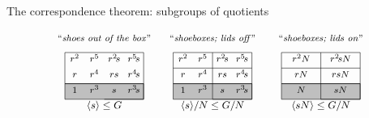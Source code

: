 \documentclass[8pt, handout]{beamer}
\begin{document}
\begin{frame}{The correspondence theorem: subgroups of quotients}
  \medskip

  \[
  \begin{tikzpicture}[scale=.61]
    \tikzstyle{every node}=[font=\footnotesize,anchor=south]
    \begin{scope}[shift={(11,0)}]
      \node at (2,2.7) {``\emph{shoeboxes; lids on}''};
      \draw[thin,fill=faded] (0,0) rectangle (4,.8);
      \draw[thin] (0,2.4) to (4,2.4); 
      \draw[thin] (0,1.6) to (4,1.6);
      \draw[thin] (0,.8) to (4,.8);
      \draw[thin] (2,0) to (4,0);
      \draw[thin] (4,0) to (4,2.4);
      \draw[thin] (0,.8) to (0,2.4);
      \draw[thin] (2,0) to (2,2.4);
      \node at (1,.13) {$N$};
      \node at (3,.13) {$sN$};
      \node at (1,.93) {$rN$};
      \node at (3,.93) {$rsN$};
      \node at (1,1.73) {$r^2N$};
      \node at (3,1.73) {$r^2\!sN$};
      \node at (2,-.8) {\small $\<sN\>\leq G/N$};
    \end{scope}
    \begin{scope}[shift={(5.5,0)}]
      \node at (2,2.7) {``\emph{shoeboxes; lids off}''};
      \draw[thin,fill=faded] (0,0) rectangle (4,.8);
      \draw[thin] (0,2.4) to (4,2.4); 
      \draw[thin] (0,1.6) to (4,1.6);
      \draw[thin] (0,.8) to (4,.8);
      \draw[thin] (2,0) to (4,0);
      \draw[thin] (4,0) to (4,2.4);
      \draw[thin] (0,.8) to (0,2.4);
      \node at (.5,.13) {$1$};
      \node at (1.5,.13) {$r^3$};
      \node at (2.5,.13) {$s$};
      \node at (3.5,.13) {$r^3\!s$};
      \node at (.5,.93) {$r$};
      \node at (1.5,.93) {$r^4$};
      \node at (2.5,.93) {$rs$};
      \node at (3.5,.93) {$r^4\!s$};
      \node at (.5,1.73) {$r^2$};
      \node at (1.5,1.73) {$r^5$};
      \node at (2.5,1.73) {$r^2\!s$};
      \node at (3.5,1.73) {$r^5\!s$};
      \node at (2,-.8) {\small $\<s\>/N\leq G/N$};
      \draw[thin] (2,0) to (2,2.4);
    \end{scope}
    \begin{scope}[shift={(0,0)}]
      \node at (2,2.7) {``\emph{shoes out of the box}''};
      \draw[thin,fill=faded] (0,0) rectangle (4,.8);
      \draw[thin] (0,2.4) to (4,2.4); 
      \draw[thin] (0,.8) to (4,.8);
      \draw[thin] (2,0) to (4,0);
      \draw[thin] (4,0) to (4,2.4);
      \draw[thin] (0,.8) to (0,2.4);
      \node at (.5,.13) {$1$};
      \node at (1.5,.13) {$r^3$};
      \node at (2.5,.13) {$s$};
      \node at (3.5,.13) {$r^3\!s$};
      \node at (.5,.93) {$r$};
      \node at (1.5,.93) {$r^4$};
      \node at (2.5,.93) {$rs$};
      \node at (3.5,.93) {$r^4\!s$};
      \node at (.5,1.73) {$r^2$};
      \node at (1.5,1.73) {$r^5$};
      \node at (2.5,1.73) {$r^2\!s$};
      \node at (3.5,1.73) {$r^5\!s$};
      \node at (2,-.8) {\small $\<s\>\leq G$};
    \end{scope}
  \end{tikzpicture}
  \]

  \end{frame}
\end{document}
